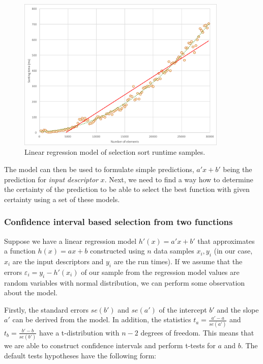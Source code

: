 \begin{figure}[h!]
	\captionsetup{justification=centering,margin=0.5cm}
	\centerline{\mbox{\includegraphics[width=100mm]{./img/selection_sort_linear_trendline.png}}}
	\caption{Linear regression model of selection sort runtime samples.}
	\label{fig:selection_sort_linear_trendline}
\end{figure}

The model can then be used to formulate simple predictions, $a'x + b'$ being the prediction for \textit{input descriptor} $x$. Next, we need to find a way how to determine the certainty of the prediction to be able to select the best function with given certainty using a set of these models.

\subsubsection{Confidence interval based selection from two functions}
\label{subsubsec:confidence_interval_selection}

Suppose we have a linear regression model \(h'(x) = a' x + b'\) that approximates a function $h(x) = ax + b$ constructed using \(n\) data samples \(x_i, y_i\) (in our case, \(x_i\) are the input descriptors and \(y_i\) are the run times). If we assume that the errors $\varepsilon_i = y_i - h'(x_i)$ of our sample from the regression model values are random variables with normal distribution, we can perform some observation about the model.

Firstly, the standard errors $se(b')$ and $se(a')$ of the intercept $b'$ and the slope $a'$ can be derived from the model. In addition, the statistics $t_a = \frac{a' - a}{se(a')}$ and $t_b = \frac{b' - b}{se(b')}$ have a t-distribution with $n-2$ degrees of freedom. This means that we are able to construct confidence intervals and perform t-tests for $a$ and $b$. The default tests hypotheses have the following form:


